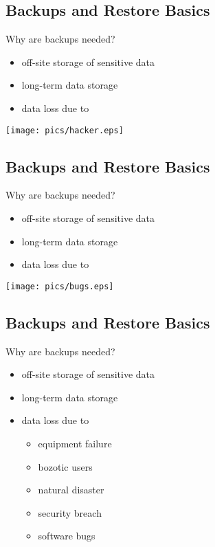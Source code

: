 \documentclass[xga]{xdvislides}
\begin{document}
\subsection{Backups and Restore Basics}
Why are backups needed?
\begin{itemize}
	\item off-site storage of sensitive data
	\item long-term data storage
	\item data loss due to
\end{itemize}
\vspace*{\fill}
\begin{center}
	\texttt{[image: pics/hacker.eps]}
\end{center}
\vspace*{\fill}

\subsection{Backups and Restore Basics}
Why are backups needed?
\begin{itemize}
	\item off-site storage of sensitive data
	\item long-term data storage
	\item data loss due to
\end{itemize}
\vspace*{\fill}
\begin{center}
	\texttt{[image: pics/bugs.eps]}
\end{center}
\vspace*{\fill}

\subsection{Backups and Restore Basics}
Why are backups needed?
\begin{itemize}
	\item off-site storage of sensitive data
	\item long-term data storage
	\item data loss due to
		\begin{itemize}
			\item equipment failure
			\item bozotic users
			\item natural disaster
			\item security breach
			\item software bugs
		\end{itemize}
\end{itemize}
\end{document}
